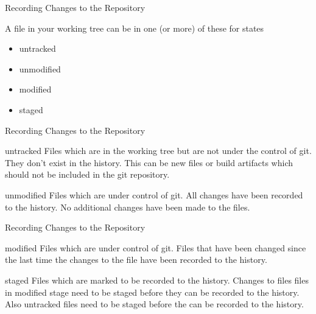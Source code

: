\documentclass[aspectratio=169]{beamer}
\newcommand{\sectiontitle}{}
\begin{document}
\begin{frame}{Recording Changes to the Repository}{\sectiontitle}
\begin{block}{A file in your working tree can be in one (or more) of these for states}
    \begin{itemize}
        \item untracked
        \item unmodified
        \item modified
        \item staged
    \end{itemize}
\end{block}
\end{frame}

\begin{frame}{Recording Changes to the Repository}{\sectiontitle}
\begin{block}{untracked}
    Files which are in the working tree but are not under the control of git.
    They don't exist in the history. This can be new files or build artifacts
    which should not be included in the git repository.
\end{block}
\begin{block}{unmodified}
    Files which are under control of git. All changes have been recorded to the
    history. No additional changes have been made to the files.
\end{block}
\end{frame}


\begin{frame}{Recording Changes to the Repository}{\sectiontitle}
\begin{block}{modified}
    Files which are under control of git. Files that have been changed since
    the last time the changes to the file have been recorded to the history.
\end{block}
\begin{block}{staged}
    Files which are marked to be recorded to the history. Changes to files files
    in modified stage need to be staged before they can be recorded to the
    history. Also untracked files need to be staged before the can be recorded to
    the history.
\end{block}
\end{frame}
\end{document}
